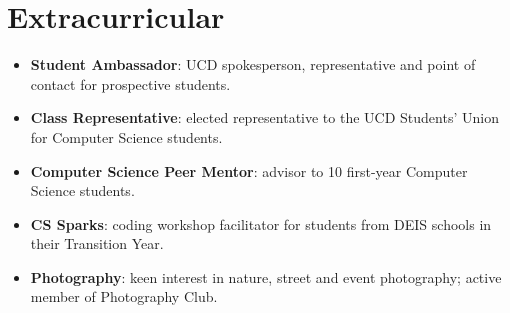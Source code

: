 \documentclass[letterpaper,11pt]{article}
\newcommand{\resumeItem}[1]{
\item\small{
        {#1 \vspace{-2pt}}
    }
}
\newcommand{\resumeSimpleListStart}{\renewcommand\labelitemi{\tiny$\bullet$}\begin{itemize}[itemsep=1pt]}
\newcommand{\resumeSimpleListEnd}{\end{itemize}\vspace{-1pt}}
\begin{document}
\section{Extracurricular}

\resumeSimpleListStart
\resumeItem{\textbf{Student Ambassador}: UCD spokesperson, representative and point of contact for prospective students.}
\resumeItem{\textbf{Class Representative}: elected representative to the UCD Students’ Union for Computer Science students.}
\resumeItem{\textbf{Computer Science Peer Mentor}: advisor to 10 first-year Computer Science students.}
\resumeItem{\textbf{CS Sparks}: coding workshop facilitator for students from DEIS schools in their Transition Year.}
\resumeItem{\textbf{Photography}: keen interest in nature, street and event photography; active member of Photography Club.}
\resumeSimpleListEnd


\end{document}
